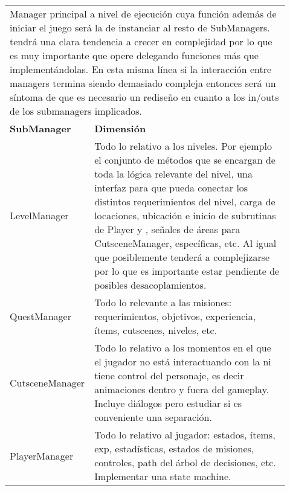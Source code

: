 \pagebreak[4]
\begin{center}
	\color{colortableborder}
	\setlength{\arrayrulewidth}{1pt} 
	\begin{longtable}{|p{0.2\linewidth}|p{0.725\linewidth}|}
		\hline
		\endhead
		\rowcolor{colorthbg}\multicolumn{2}{|l|}{\color{colorthtext}\textbf{GameManager}} \\
		\hline
		\multicolumn{2}{|p{0.961\linewidth}|}{\color{colortextotabla}Manager principal a nivel de ejecución cuya función además de iniciar el juego será la de instanciar al resto de SubManagers. \lsc{GM} tendrá una clara tendencia a crecer en complejidad por lo que es muy importante que opere delegando funciones más que implementándolas. En esta misma línea si la interacción entre managers termina siendo demasiado compleja entonces será un síntoma de que es necesario un rediseño en cuanto a los in/outs de los submanagers implicados.} \\
		\hline
		\rowcolor{colorthbg}\color{colorthtext}\textbf{SubManager} & \color{colorthtext}\textbf{Dimensión} \\
		\hline
		\color{colorthalt}LevelManager & \color{colortextotabla}Todo lo relativo a los niveles. Por ejemplo el conjunto de métodos que se encargan de toda la lógica relevante del nivel, una interfaz para que \lsc{GM} pueda conectar los distintos requerimientos del nivel, carga de locaciones, ubicación e inicio de subrutinas de Player y \lsc{NPC}, señales de áreas para CutsceneManager, \lsc{UI} específicas, etc. 
		Al igual que \lsc{GM} posiblemente tenderá a complejizarse por lo que es importante estar pendiente de posibles desacoplamientos. \\
		\hline
		\color{colorthalt}QuestManager & \color{colortextotabla}Todo lo relevante a las misiones: requerimientos, objetivos, experiencia, ítems, cutscenes, niveles, etc. \\
		\hline
		\color{colorthalt}Cutscene\newline{}Manager & \color{colortextotabla}Todo lo relativo a los momentos en el que el jugador no está interactuando con la \lsc{UI} ni tiene control del personaje, es decir animaciones dentro y fuera del gameplay. Incluye diálogos pero estudiar si es conveniente una separación. \\
		\hline
		\color{colorthalt}PlayerManager & \color{colortextotabla}Todo lo relativo al jugador: estados, ítems, exp, estadísticas, estados de misiones, controles, path del árbol de decisiones, etc. Implementar una state machine.\\

\end{longtable}
\end{center}
